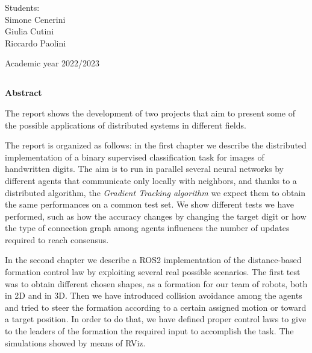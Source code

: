 \documentclass[a4paper,11pt,oneside]{book}
\begin{document}
\begin{flushright}
      {\large Students:}\\
      {Simone Cenerini} \\
      {Giulia Cutini} \\
      {Riccardo Paolini} \\
\end{flushright}        %
\begin{center}
\vfill
      {\large Academic year \@2022/2023} \\
\end{center}



\newpage
\thispagestyle{empty}

\begin{center}
\chapter*{}
\thispagestyle{empty}
{\Huge \textbf{Abstract}}\\
\vspace{15mm}
\end{center}

The report shows the development of two projects that aim to present some of the possible applications of distributed systems in different fields.

\bigskip
The report is organized as follows: in the first chapter we describe the distributed implementation of a binary supervised classification task for images of handwritten digits. The aim is to run in parallel several neural networks by different agents that communicate only locally with neighbors, and thanks to a distributed algorithm, the \textit{Gradient Tracking algorithm} we expect them to obtain the same performances on a common test set. We show different tests we have performed, such as how the accuracy changes by changing the target digit or how the type of connection graph among agents influences the number of updates required to reach consensus.

\bigskip
In the second chapter we describe a ROS2 implementation of the distance-based formation control law by exploiting several real possible scenarios. The first test was to obtain different chosen shapes, as a formation for our team of robots, both in 2D and in 3D. 
Then we have introduced collision avoidance among the agents and tried to steer the formation according to a certain assigned motion or toward a target position. In order to do that, we have defined proper control laws to give to the leaders of the formation the required input to accomplish the task.
The simulations showed by means of RViz.
\end{document}
